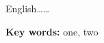 \null\par
\begin{englishabstract}
    
English……
















\par\null\par\null\par %
\noindent \textbf{Key words:} one, two    %
\end{englishabstract}